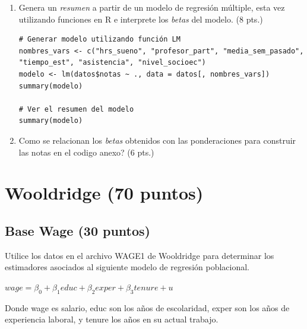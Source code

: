 \documentclass[letterpaper,11pt]{article}
\begin{document}
\begin{enumerate}
\begin{lstlisting}
# Calcular X^T
Xt <- t(X)

# Calcular X^T X
XtX <- t(X) %*% X

# Calcular X^T y
Xty <- t(X) %*% datos$notas

# Calcular los estimadores beta
beta_hat <- solve(XtX) %*% Xty
\end{lstlisting}



    \item Genera un \textit{resumen} a partir de un modelo de regresión múltiple, esta vez utilizando funciones en R e interprete los \textit{betas} del modelo. (8 pts.)
    \begin{lstlisting}
# Generar modelo utilizando función LM
nombres_vars <- c("hrs_sueno", "profesor_part", "media_sem_pasado", "tiempo_est", "asistencia", "nivel_socioec")
modelo <- lm(datos$notas ~ ., data = datos[, nombres_vars])
summary(modelo)

# Ver el resumen del modelo
summary(modelo)
\end{lstlisting}

        \item \textquestiondown Como se relacionan los \textit{betas} obtenidos con las ponderaciones para construir las notas en el codigo anexo? (6 pts.)
        


    
\end{enumerate}

\section{Wooldridge  (70 puntos)}

\subsection{Base Wage (30 puntos)}

Utilice los datos en el archivo WAGE1 de Wooldridge para determinar los estimadores asociados al  siguiente modelo de regresión poblacional.

$wage=\beta_0+ \beta_1educ +\beta_2exper+ \beta_3tenure+u$


Donde wage es salario, educ son los años de escolaridad, 
exper son los años de experiencia laboral, y tenure los años en su actual trabajo.
\end{document}
